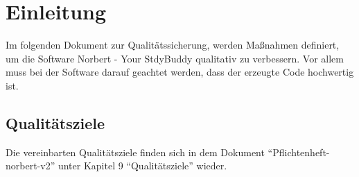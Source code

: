 
\chapter{Einleitung}
Im folgenden Dokument zur Qualitätssicherung, werden Maßnahmen definiert, um die Software Norbert - Your StdyBuddy qualitativ zu verbessern. Vor allem muss bei der Software darauf geachtet werden, dass der erzeugte Code hochwertig ist. 



\section{Qualitätsziele}
Die vereinbarten Qualitätsziele finden sich in dem Dokument \enquote{Pflichtenheft-norbert-v2} unter Kapitel 9 \enquote{Qualitätsziele} wieder.


